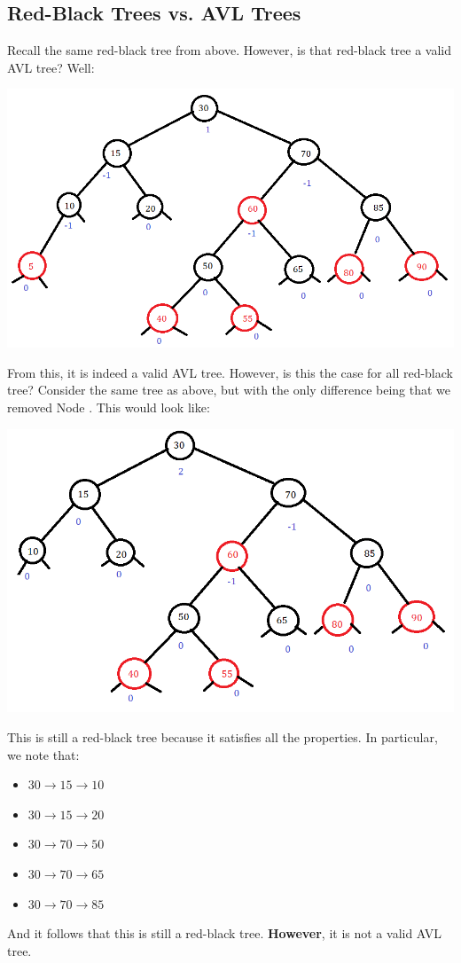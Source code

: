 \documentclass[letterpaper]{article}
\begin{document}
\subsection{Red-Black Trees vs. AVL Trees}
Recall the same red-black tree from above. However, is that red-black tree a valid AVL tree? Well: 
\begin{center}
    \includegraphics[scale=0.6]{img/rb_tree_avl.png}
\end{center}
From this, it is indeed a valid AVL tree. However, is this the case for all red-black tree? Consider the same tree as above, but with the only difference being that we removed Node . This would look like: 
\begin{center}
    \includegraphics[scale=0.6]{img/rb_tree_no_avl.png}
\end{center}
This is still a red-black tree because it satisfies all the properties. In particular, we note that: 
\begin{itemize}
    \item $30 \to 15 \to 10$
    \item $30 \to 15 \to 20$
    \item $30 \to 70 \to 50$
    \item $30 \to 70 \to 65$
    \item $30 \to 70 \to 85$
\end{itemize}
And it follows that this is still a red-black tree. \textbf{However}, it is not a valid AVL tree. 
\end{document}
